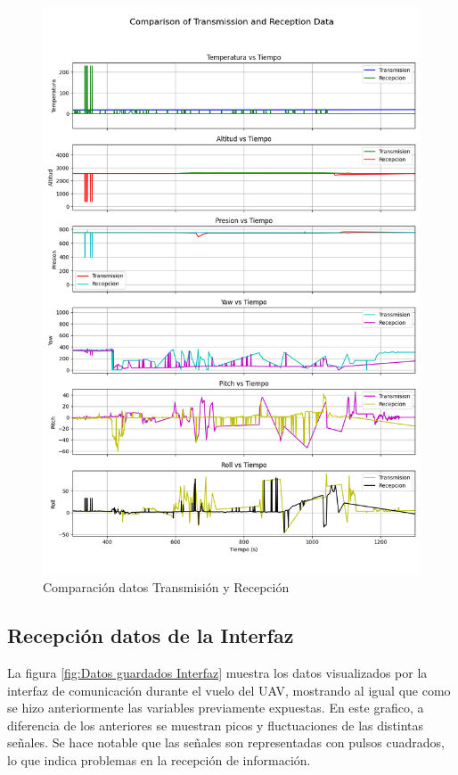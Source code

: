         \begin{figure}[H]
            \centering
            \includegraphics[width=\textwidth]{Imagenes/Vuelo/comparison_subplots.png}
            \caption{Comparación datos Transmisión y Recepción}
            \label{fig:comparacion transmision y recepcion}
        \end{figure}

    \subsection{Recepción datos de la Interfaz}


        La figura  \ref{fig:Datos guardados Interfaz} muestra los datos visualizados por la interfaz de comunicación durante el vuelo del UAV, mostrando al igual que como se hizo anteriormente las variables previamente expuestas. En este grafico, a diferencia de los anteriores se muestran picos y fluctuaciones de las distintas señales. Se hace notable que las señales son representadas con pulsos cuadrados, lo que indica problemas en la recepción de información. \\

